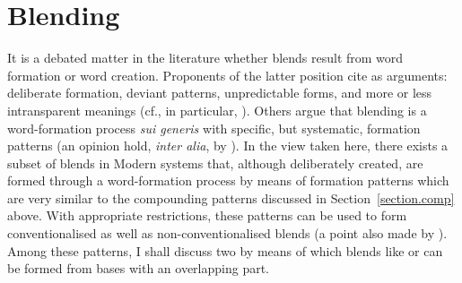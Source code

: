 \documentclass[output=paper
  ,nobabel
  ,draftmode
  ,colorlinks, citecolor=brown
]{langscibook}
\begin{document}
\section{Blending}
\label{section.blend}
It is a debated matter in the literature whether blends result from word
formation or word creation. Proponents of the latter position cite as arguments:
deliberate formation, deviant patterns, unpredictable forms, and more or less
intransparent meanings (cf., in particular, \citealt{ronneberger-sibold:2006:lexical:blends,ronneberger-sibold:2015:word:creation}). Others argue that blending is a
word-formation process \emph{sui generis} with specific,
but systematic, formation patterns (an opinion hold, \emph{inter
alia}, by \citealt{mueller:et:al:2011:kontamination}). In the view taken here, there
exists a subset of blends in Modern  systems that, although deliberately
created, are formed through a word-formation process by means of formation
patterns which are very similar to the compounding patterns discussed in
Section \ref{section.comp} above. With appropriate
restrictions, these patterns can be used to form conventionalised as well as
non-conventionalised blends (a point also made by \citealt{schulz:2004:jein:fortschrott}). Among these patterns, I shall discuss
two by means of which blends like \emph{} or \emph{} can be formed from bases with an overlapping
part.
\end{document}
